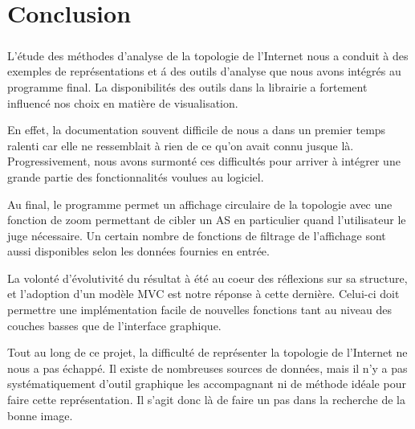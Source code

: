 \section*{Conclusion}

\subparagraph{}
L'\'etude des m\'ethodes d'analyse de la topologie de l'Internet nous a conduit \`a des exemples de repr\'esentations et \'a des outils d'analyse que nous avons int\'egr\'es au programme final.
La  disponibilit\'es des outils dans la librairie \boost a fortement influenc\'e nos choix en mati\`ere de visualisation.

En effet, la documentation souvent difficile de \boost nous a dans un premier temps ralenti car elle ne ressemblait \`a rien de ce qu'on avait connu jusque l\`a. Progressivement, nous avons surmont\'e ces difficult\'es pour arriver \`a int\'egrer une grande partie des fonctionnalit\'es voulues au logiciel.

Au final, le programme permet un affichage circulaire de la topologie avec une fonction de zoom permettant de cibler un AS en particulier quand l'utilisateur le juge n\'ecessaire. Un certain nombre de fonctions de filtrage de l'affichage sont aussi disponibles selon les donn\'ees fournies en entr\'ee.

La volont\'e d'\'evolutivit\'e du r\'esultat \`a \'et\'e au coeur des r\'eflexions sur sa structure, et l'adoption d'un mod\`ele MVC est notre r\'eponse \`a cette derni\`ere. Celui-ci doit permettre une impl\'ementation facile de nouvelles fonctions tant au niveau des couches basses que de l'interface graphique.

Tout au long de ce projet, la difficult\'e de repr\'esenter la topologie de l'Internet ne nous a pas \'echapp\'e. Il existe de nombreuses sources de donn\'ees, mais il n'y a pas syst\'ematiquement d'outil graphique les accompagnant ni de m\'ethode id\'eale pour faire cette repr\'esentation. Il s'agit donc l\`a de faire un pas dans la recherche de la bonne image.